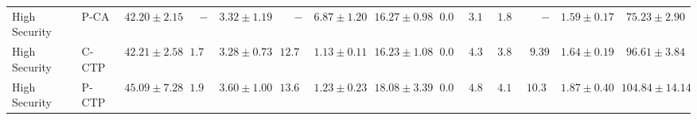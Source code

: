 \begin{table}[htbp]
\begin{tabular}{llrrrrrrrrrrrr}
  High Security & P-CA & $42.20 \pm 2.15$ & $-$ & $3.32 \pm 1.19$ & $-$ & $6.87 \pm 1.20$ & $16.27 \pm 0.98$ & $0.01$ & $3.15$ & $1.83$ & $-$ & $1.59 \pm 0.17$ & \textbf{$75.23 \pm 2.90$} \\
  High Security & C-CTP & $42.21 \pm 2.58$ & $1.72$ & $3.28 \pm 0.73$ & $12.78$ & $1.13 \pm 0.11$ & $16.23 \pm 1.08$ & $0.01$ & $4.37$ & $3.84$ & $9.39$ & $1.64 \pm 0.19$ & \textbf{$96.61 \pm 3.84$} \\
  High Security & P-CTP & $45.09 \pm 7.28$ & $1.97$ & $3.60 \pm 1.00$ & $13.64$ & $1.23 \pm 0.23$ & $18.08 \pm 3.39$ & $0.01$ & $4.88$ & $4.13$ & $10.34$ & $1.87 \pm 0.40$ & \textbf{$104.84 \pm 14.14$} \\
    \bottomrule
  \end{tabular}
\end{table}
